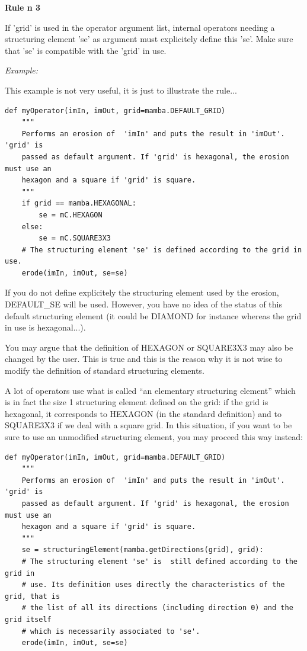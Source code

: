 \documentclass[a4paper,10pt,oneside]{article}
\begin{document}
\par
    
\textbf{Rule n\textdegree{} 3}

If 'grid' is used in the operator argument list, internal operators needing a 
structuring element 'se' as argument must explicitely define this 'se'. Make 
sure that 'se' is compatible with the 'grid' in use.\par 

\emph{Example:}

This example is not very useful, it is just to illustrate the rule...

\lstset{language=Python}
\begin{lstlisting}
def myOperator(imIn, imOut, grid=mamba.DEFAULT_GRID)
    """
    Performs an erosion of  'imIn' and puts the result in 'imOut'. 'grid' is
    passed as default argument. If 'grid' is hexagonal, the erosion must use an 
    hexagon and a square if 'grid' is square.
    """
    if grid == mamba.HEXAGONAL:
        se = mC.HEXAGON
    else:
        se = mC.SQUARE3X3
    # The structuring element 'se' is defined according to the grid in use.
    erode(imIn, imOut, se=se)
\end{lstlisting}

If you do not define explicitely the structuring element used by the erosion, 
DEFAULT\_SE will be used. However, you have no idea of  the status of this 
default structuring element (it could be DIAMOND for instance whereas the grid 
in use is hexagonal...).

You may argue that the definition of HEXAGON or SQUARE3X3 may also be changed by 
the user. This is true and this is the reason why it is not wise to modify the 
definition of standard structuring elements.

A lot of operators use what is called ``an elementary structuring element'' 
which is in fact the size 1 structuring element defined on the grid: if the grid 
is hexagonal, it corresponds to HEXAGON (in the standard definition) and to 
SQUARE3X3 if we deal with a square grid. In this situation, if you want to be 
sure to use an unmodified structuring element, you may proceed this way instead:

\lstset{language=Python}
\begin{lstlisting}
def myOperator(imIn, imOut, grid=mamba.DEFAULT_GRID)
    """
    Performs an erosion of  'imIn' and puts the result in 'imOut'. 'grid' is
    passed as default argument. If 'grid' is hexagonal, the erosion must use an 
    hexagon and a square if 'grid' is square.
    """
    se = structuringElement(mamba.getDirections(grid), grid):
    # The structuring element 'se' is  still defined according to the grid in 
    # use. Its definition uses directly the characteristics of the grid, that is
    # the list of all its directions (including direction 0) and the grid itself
    # which is necessarily associated to 'se'.
    erode(imIn, imOut, se=se)
\end{lstlisting}
\end{document}
